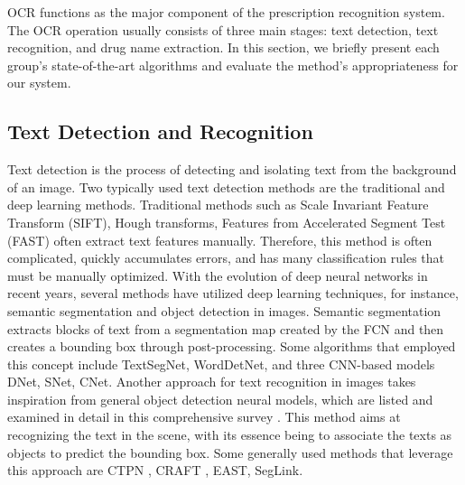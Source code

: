 OCR functions as the major component of the prescription recognition system. The OCR operation usually consists of three main stages: text detection, text recognition, and drug name extraction. In this section, we briefly present each group's state-of-the-art algorithms and evaluate the method's appropriateness for our system.
\subsection{Text Detection and Recognition}

Text detection is the process of detecting and isolating text from the background of an image. Two typically used text detection methods are the traditional and deep learning methods. Traditional methods such as Scale Invariant Feature Transform (SIFT), Hough transforms, Features from Accelerated Segment Test (FAST) often extract text features manually. Therefore, this method is often complicated, quickly accumulates errors, and has many classification rules that must be manually optimized. With the evolution of deep neural networks in recent years, %
several methods have utilized deep learning techniques, for instance, semantic segmentation and object detection in images. Semantic segmentation extracts blocks of text from a segmentation map created by the FCN and then creates a bounding box through post-processing. Some algorithms that employed this concept include TextSegNet, WordDetNet, and three CNN-based models DNet, SNet, CNet. 
Another approach for text recognition in images takes inspiration from general object detection neural models, which are listed and examined in detail in this comprehensive survey \cite{ye2014text}. This method aims at recognizing the text in the scene, with its essence being to associate the texts as objects to predict the bounding box. 
Some generally used methods that leverage this approach are CTPN \cite{tian2016detecting}, CRAFT \cite{baek2019character}, EAST, SegLink.

